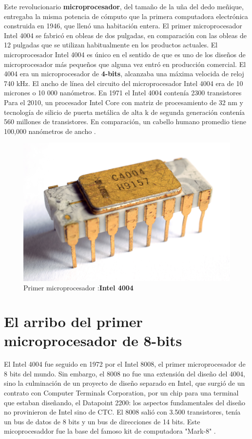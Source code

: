 Este revolucionario \textbf{microprocesador}, del tamaño de la uña del dedo meñique, entregaba la misma potencia de cómputo que la primera computadora electrónica construida 
en 1946, que llenó una habitación entera. El primer microprocesador Intel 4004 se fabricó en obleas de dos pulgadas, en comparación con las obleas de 12 
pulgadas que se utilizan habitualmente en los productos actuales. El microprocesador Intel 4004 es único en el sentido de que es uno de los diseños de 
microprocesador más pequeños que alguna vez entró en producción comercial. El 4004  era un microprocesador de \textbf{4-bits}, alcanzaba 
una máxima velocida de reloj 740 kHz. El ancho de línea del circuito del microprocesador Intel 4004 era de 10 micrones o 10 000 nanómetros. 
En 1971 el Intel 4004 contenía 2300 transistores Para el 2010, un procesador Intel Core con matriz de procesamiento de 32 nm y tecnología de silicio de puerta metálica de alta k de 
segunda generación contenía  560 millones de transistores. En comparación, un cabello humano promedio tiene 100,000 nanómetros de ancho .      

\begin{figure}[htb]
	\centering
	\includegraphics[scale = 0.15]{Graphics/Intel_C4004.jpg}
	\caption{Primer microprocesador :\textbf{Intel 4004}}
	\label{fig:12}
\end{figure}


\section{El arribo del primer microprocesador de 8-bits}

El Intel 4004 fue seguido en 1972 por el Intel 8008, el primer microprocesador de 8 bits del mundo. Sin embargo, el 8008 no fue una extensión del diseño del 4004, 
sino la culminación de un proyecto de diseño separado en Intel, que surgió de un contrato con Computer Terminals Corporation, por un chip para una 
terminal que estaban diseñando, el Datapoint 2200: los aspectos fundamentales del diseño no provinieron de Intel sino de CTC. 
El 8008 salió con 3.500 transistores, tenía un bus de datos de 8 bits y un bus de direcciones de 14 bits. Este micoprocesaddor fue la base del famoso kit de 
computadora "Mark-8" .

